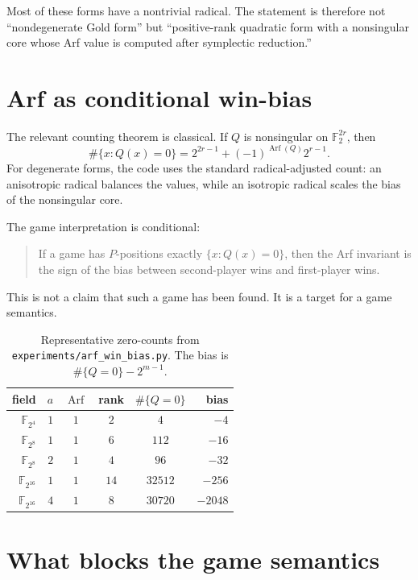\documentclass[11pt]{article}
\theoremstyle{definition}
\newcommand{\F}{\mathbb{F}}
\newcommand{\Arf}{\operatorname{Arf}}
\begin{document}
Most of these forms have a nontrivial radical. The statement is therefore not
``nondegenerate Gold form'' but ``positive-rank quadratic form with a
nonsingular core whose Arf value is computed after symplectic reduction.''

\section{Arf as conditional win-bias}

The relevant counting theorem is classical. If $Q$ is nonsingular on
$\F_2^{2r}$, then
\[
  \#\{x:Q(x)=0\}
  =
  2^{2r-1}+(-1)^{\Arf(Q)}2^{r-1}.
\]
For degenerate forms, the code uses the standard radical-adjusted count: an
anisotropic radical balances the values, while an isotropic radical scales the
bias of the nonsingular core.

The game interpretation is conditional:

\begin{quote}
If a game has $P$-positions exactly $\{x:Q(x)=0\}$, then the Arf invariant is
the sign of the bias between second-player wins and first-player wins.
\end{quote}

This is not a claim that such a game has been found. It is a target for a game
semantics.

\begin{table}[h]
\centering
\begin{tabular}{rrcccr}
\toprule
field & $a$ & $\Arf$ & rank & $\#\{Q=0\}$ & bias \\
\midrule
$\F_{2^{4}}$  & $1$ & $1$ & $2$  & $4$     & $-4$ \\
$\F_{2^{8}}$  & $1$ & $1$ & $6$  & $112$   & $-16$ \\
$\F_{2^{8}}$  & $2$ & $1$ & $4$  & $96$    & $-32$ \\
$\F_{2^{16}}$ & $1$ & $1$ & $14$ & $32512$ & $-256$ \\
$\F_{2^{16}}$ & $4$ & $1$ & $8$  & $30720$ & $-2048$ \\
\bottomrule
\end{tabular}
\caption{Representative zero-counts from
\texttt{experiments/arf\_win\_bias.py}. The bias is
$\#\{Q=0\}-2^{m-1}$.}
\label{tab:bias}
\end{table}

\section{What blocks the game semantics}
\end{document}
